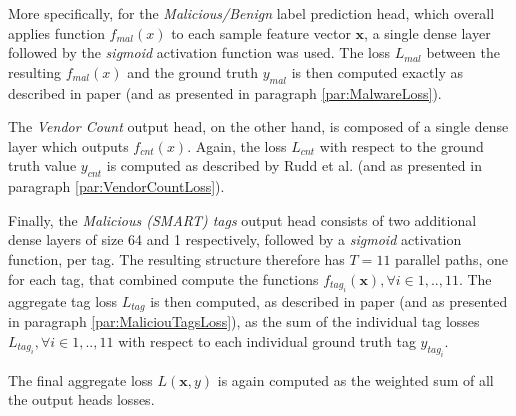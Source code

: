 \documentclass[pdfa%
,cucitura%
]{toptesi}
\begin{document}
More specifically, for the \textit{Malicious/Benign} label prediction head, which overall applies function $f_{mal}(x)$ to each sample feature vector $\textbf{x}$, a single dense layer followed by the \textit{sigmoid} activation function was used. The loss $L_{mal}$ between the resulting $f_{mal}(x)$ and the ground truth $y_{mal}$ is then computed exactly as described in paper \cite{ruddALOHA} (and as presented in paragraph \ref{par:MalwareLoss}).

The \textit{Vendor Count} output head, on the other hand, is composed of a single dense layer which outputs $f_{cnt}(x)$. Again, the loss $L_{cnt}$ with respect to the ground truth value $y_{cnt}$ is computed as described by Rudd et al. \cite{ruddALOHA} (and as presented in paragraph \ref{par:VendorCountLoss}).

Finally, the \textit{Malicious (SMART) tags} output head consists of two additional dense layers of size 64 and 1 respectively, followed by a \textit{sigmoid} activation function, per tag. The resulting structure therefore has $T=11$ parallel paths, one for each tag, that combined compute the functions $f_{tag_i}(\textbf{x}), \forall i \in 1,..,11$. The aggregate tag loss $L_{tag}$ is then computed, as described in paper \cite{ruddALOHA} (and as presented in paragraph \ref{par:MaliciouTagsLoss}), as the sum of the individual tag losses $L_{tag_i}, \forall i \in 1,..,11$ with respect to each individual ground truth tag $y_{tag_i}$.

The final aggregate loss $L(\textbf{x}, y)$ is again computed as the weighted sum of all the output heads losses.
\end{document}
